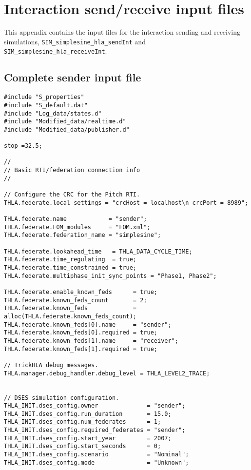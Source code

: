 \chapter{Interaction send/receive input files}\label{sec:send-receive-inputs}

This appendix contains the input files for the interaction
sending and receiving simulations,
{\tt SIM\_\-simple\-sine\_\-hla\_sendInt} and
{\tt SIM\_simplesine\_hla\_receiveInt}.

\section{Complete sender input file}\label{sec:complete-sender-input}

\begin{lstlisting}[caption={{\tt SIM\_simplesine\_hla\_sendInt} input file},label={list:complete-sender-input}]
#include "S_properties"
#include "S_default.dat"
#include "Log_data/states.d"
#include "Modified_data/realtime.d"
#include "Modified_data/publisher.d"

stop =32.5; 

//
// Basic RTI/federation connection info
//

// Configure the CRC for the Pitch RTI.
THLA.federate.local_settings = "crcHost = localhost\n crcPort = 8989";

THLA.federate.name            = "sender"; 
THLA.federate.FOM_modules     = "FOM.xml"; 
THLA.federate.federation_name = "simplesine"; 

THLA.federate.lookahead_time   = THLA_DATA_CYCLE_TIME;
THLA.federate.time_regulating  = true; 
THLA.federate.time_constrained = true; 
THLA.federate.multiphase_init_sync_points = "Phase1, Phase2";

THLA.federate.enable_known_feds      = true; 
THLA.federate.known_feds_count       = 2; 
THLA.federate.known_feds             = alloc(THLA.federate.known_feds_count); 
THLA.federate.known_feds[0].name     = "sender"; 
THLA.federate.known_feds[0].required = true; 
THLA.federate.known_feds[1].name     = "receiver"; 
THLA.federate.known_feds[1].required = true; 

// TrickHLA debug messages.
THLA.manager.debug_handler.debug_level = THLA_LEVEL2_TRACE;


// DSES simulation configuration.
THLA_INIT.dses_config.owner              = "sender";
THLA_INIT.dses_config.run_duration       = 15.0;
THLA_INIT.dses_config.num_federates      = 1;
THLA_INIT.dses_config.required_federates = "sender";
THLA_INIT.dses_config.start_year         = 2007;
THLA_INIT.dses_config.start_seconds      = 0;
THLA_INIT.dses_config.scenario           = "Nominal";
THLA_INIT.dses_config.mode               = "Unknown";


\end{lstlisting}

